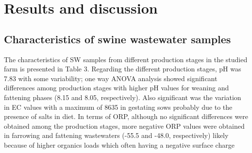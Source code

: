 \section{Results and discussion}
\subsection{Characteristics of swine wastewater samples}
The characteristics of SW samples from different production stages in the studied farm is presented in Table 3. Regarding the different production stages, pH was 7.83 with some variability; one way ANOVA analysis showed significant differences among production stages with higher pH values for weaning and fattening phases (8.15 and 8.05, respectively). Also significant was the variation in EC values with a maximum of 8635 in gestating sows probably due to the presence of salts in diet. In terms of ORP, although no significant differences were obtained among the production stages, more negative ORP values were obtained in farrowing and fattening wastewaters (-55.5 and -48.0, respectively) likely because of higher organics loads which often having a negative surface charge